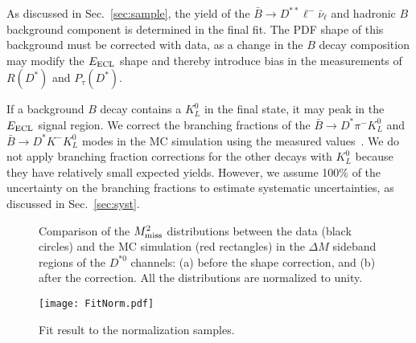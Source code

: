 \documentclass[aps,prd,twocolumn,superscriptaddress,showpacs,preprintnumbers,amsmath,amssymb]{revtex4-1}
\begin{document}
As discussed in Sec.~\ref{sec:sample}, the yield of the $\bar{B} \rightarrow D^{**} \ell^- \bar{\nu}_\ell$ and hadronic $B$ background component is determined in the final fit. The PDF shape of this background must be corrected with data, as a change in the $B$ decay composition may modify the $E_{\rm ECL}$ shape and thereby introduce bias in the measurements of $R(D^*)$ and $P_\tau(D^*)$.

If a background $B$ decay contains a $K_L^0$ in the final state, it may peak in the $E_{\rm ECL}$ signal region. We correct the branching fractions of the ${\bar B} \rightarrow D^* \pi^- K_L^0$ and ${\bar B} \rightarrow D^* K^- K_L^0$ modes in the MC simulation using the measured values~\cite{cite:PDG:2016,cite:Belle_DstKKL:2002}. We do not apply branching fraction corrections for the other decays with $K_L^0$ because they have relatively small expected yields. However, we assume 100\% of the uncertainty on the branching fractions to estimate systematic uncertainties, as discussed in Sec.~\ref{sec:syst}.

\begin{figure}[t!]
  \centering
  \caption{Comparison of the $M_{\rm miss}^2$ distributions between the data (black circles) and the MC simulation (red rectangles) in the $\Delta M$ sideband regions of the $D^{*0}$ channels: (a) before the shape correction, and (b) after the correction. All the distributions are normalized to unity.}
  \label{fig:FakeDst-Mmiss2-comp}
\end{figure}

\begin{figure*}[t!]
  \centering
  \texttt{[image: FitNorm.pdf]}
  \caption{Fit result to the normalization samples.}
  \label{fig:calib-normalization-fit}
\end{figure*}
\end{document}
